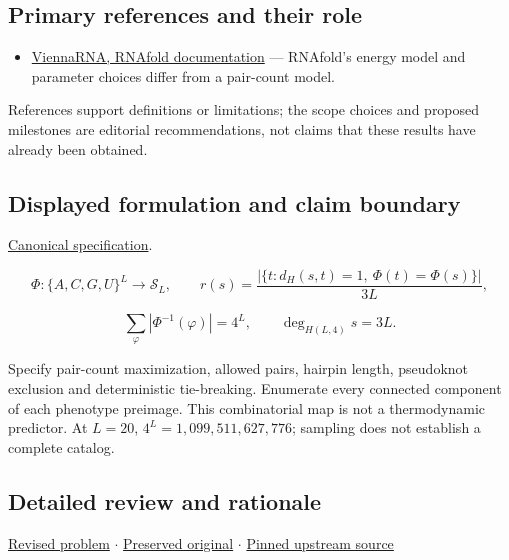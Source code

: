 \documentclass[
  11pt,
]{article}
\providecommand{\tightlist}{%
  \setlength{\itemsep}{0pt}\setlength{\parskip}{0pt}}
\begin{document}
\subsection{Primary references and their role}

\begin{itemize}
\tightlist
\item
  \href{https://www.tbi.univie.ac.at/RNA/RNAfold}{ViennaRNA, RNAfold
  documentation} --- RNAfold's energy model and parameter choices differ
  from a pair-count model.
\end{itemize}

References support definitions or limitations; the scope choices and
proposed milestones are editorial recommendations, not claims that these
results have already been obtained.

\subsection{Displayed formulation and claim boundary}

\href{https://github.com/rick-stevens-ai/Pure-Thought/blob/main/PRDs/30-Genotype-Phenotype-Mapping.md}{Canonical
specification}.

\[\Phi:\{A,C,G,U\}^L\longrightarrow\mathcal S_L,\qquad
r(s)=\frac{|\{t:d_H(s,t)=1,\ \Phi(t)=\Phi(s)\}|}{3L},\]

\[\sum_{\varphi}|\Phi^{-1}(\varphi)|=4^L,\qquad
\deg_{H(L,4)}s=3L.\]

Specify pair-count maximization, allowed pairs, hairpin length,
pseudoknot exclusion and deterministic tie-breaking. Enumerate every
connected component of each phenotype preimage. This combinatorial map
is not a thermodynamic predictor. At \(L=20\),
\(4^L=1{,}099{,}511{,}627{,}776\); sampling does not establish a
complete catalog.

\subsection{Detailed review and rationale}

\href{https://github.com/rick-stevens-ai/Pure-Thought/blob/main/PRDs/30-Genotype-Phenotype-Mapping.md}{Revised
problem} \ensuremath{\cdot}
\href{https://github.com/rick-stevens-ai/Pure-Thought/blob/main/archive/original-PRDs/30-Genotype-Phenotype-Mapping.md}{Preserved
original} \ensuremath{\cdot}
\href{https://github.com/rick-stevens-ai/Pure-Thought/blob/f854d4e12b55c1f5b5c2a964b75f2d23496d981e/PRDs/30-Genotype-Phenotype-Mapping.md}{Pinned
upstream source}
\end{document}
